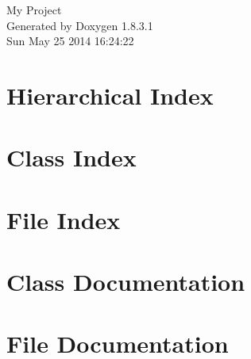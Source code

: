 \documentclass{book}
\begin{document}
\hypersetup{pageanchor=false,citecolor=blue}
\begin{titlepage}
\vspace*{7cm}
\begin{center}
{\Large My Project }\\
\vspace*{1cm}
{\large Generated by Doxygen 1.8.3.1}\\
\vspace*{0.5cm}
{\small Sun May 25 2014 16:24:22}\\
\end{center}
\end{titlepage}
\clearemptydoublepage
{}
\tableofcontents
\clearemptydoublepage
{}
\hypersetup{pageanchor=true,citecolor=blue}
\chapter{Hierarchical Index}

\chapter{Class Index}

\chapter{File Index}

\chapter{Class Documentation}












\chapter{File Documentation}




































\printindex
\end{document}
